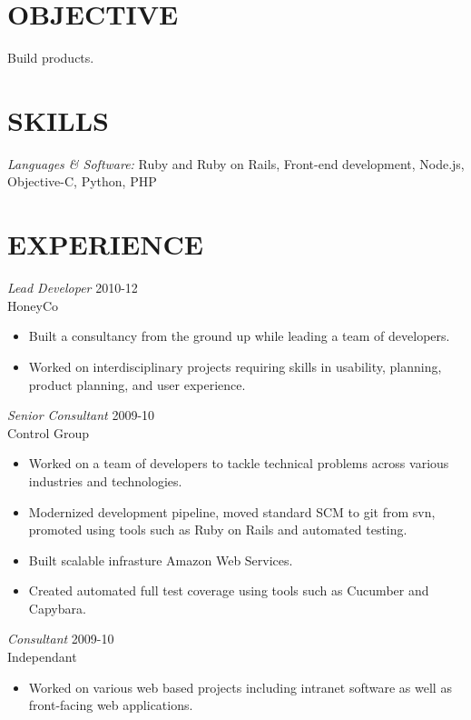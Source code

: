 \documentclass[line,margin]{res}
\begin{document}
\address{345 Eldert St. Apt. 314}
\address{(641) 233-1123}


\begin{resume}

\section{OBJECTIVE}
    Build products.

\section{SKILLS} {\sl Languages \& Software:}
    Ruby and Ruby on Rails, Front-end development,
    Node.js, Objective-C, Python, PHP

\section{EXPERIENCE}
    {\sl Lead Developer}
    \hfill 2010-12 \\
    HoneyCo
    \begin{itemize} \itemsep -2pt
        \item
            Built a consultancy from the ground up while leading
            a team of developers.
        \item
            Worked on interdisciplinary projects requiring skills in
            usability, planning, product planning, and user experience.
    \end{itemize}

    {\sl Senior Consultant}
    \hfill 2009-10 \\
    Control Group
    \begin{itemize} \itemsep -2pt
        \item
            Worked on a team of developers to tackle technical problems across
            various industries and technologies.
        \item
            Modernized development pipeline, moved standard SCM to git from svn,
            promoted using tools such as Ruby on Rails and automated testing.
        \item
            Built scalable infrasture Amazon Web Services.
        \item
            Created automated full test coverage using tools such as Cucumber and
            Capybara.
    \end{itemize}

    {\sl Consultant}
    \hfill 2009-10 \\
    Independant
    \begin{itemize} \itemsep -2pt
        \item
            Worked on various web based projects including intranet software as well
            as front-facing web applications.
    \end{itemize}


\end{resume}
\end{document}

